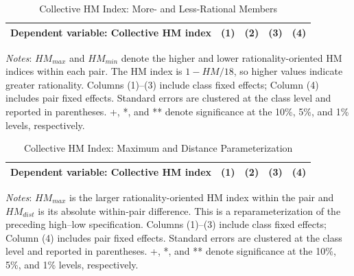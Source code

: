 \documentclass[11 pt]{article}
\begin{document}
\begin{table}[H]
\centering
\caption{Collective HM Index: More- and Less-Rational Members}
\label{tab:collective_hm_highlow}
\begin{tabular}{lcccc}
\toprule \hline
Dependent variable: Collective HM index & (1) & (2) & (3) & (4) \\
\midrule

\end{tabular}
\begin{minipage}{\textwidth}
{\footnotesize \emph{Notes}: $HM_{max}$ and $HM_{min}$ denote the higher and lower rationality-oriented HM indices within each pair. The HM index is $1-HM/18$, so higher values indicate greater rationality. Columns (1)--(3) include class fixed effects; Column (4) includes pair fixed effects. Standard errors are clustered at the class level and reported in parentheses. +, *, and ** denote significance at the 10\%, 5\%, and 1\% levels, respectively.}
\end{minipage}
\end{table}

\begin{table}[H]
\centering
\caption{Collective HM Index: Maximum and Distance Parameterization}
\label{tab:collective_hm_maxdist}
\begin{tabular}{lcccc}
\toprule \hline
Dependent variable: Collective HM index & (1) & (2) & (3) & (4) \\
\midrule

\end{tabular}
\begin{minipage}{\textwidth}
{\footnotesize \emph{Notes}: $HM_{max}$ is the larger rationality-oriented HM index within the pair and $HM_{dist}$ is its absolute within-pair difference. This is a reparameterization of the preceding high--low specification. Columns (1)--(3) include class fixed effects; Column (4) includes pair fixed effects. Standard errors are clustered at the class level and reported in parentheses. +, *, and ** denote significance at the 10\%, 5\%, and 1\% levels, respectively.}
\end{minipage}
\end{table}
\end{document}
